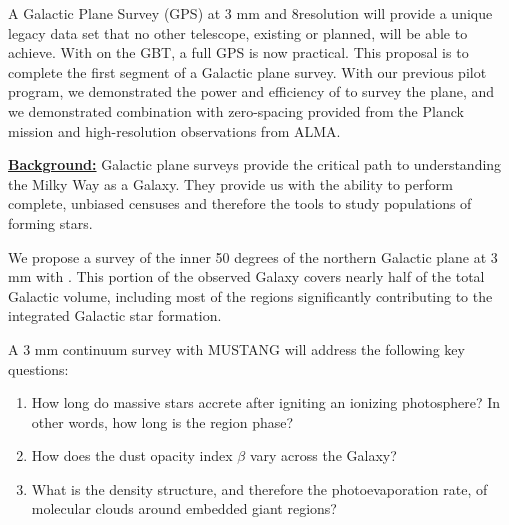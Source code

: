 \documentclass[11pt,preprint]{aastex_nofoot}
\begin{document}


A Galactic Plane Survey (GPS) at 3 mm and 8\arcsec resolution will provide a
unique legacy data set that no other telescope, existing or planned, will be
able to achieve.  With \MUSTANG on the GBT, a full GPS is now practical.  This
proposal is to complete the first segment of a Galactic plane survey.  With
our previous pilot program, we demonstrated the power and efficiency of \MUSTANG
to survey the plane, and we demonstrated combination with zero-spacing provided
from the Planck mission and high-resolution observations from ALMA.


\underline{\bf Background:}
Galactic plane surveys provide the critical path to understanding the Milky Way
as a Galaxy.  They provide us with the ability to perform complete, unbiased
censuses and therefore the tools to study populations of forming stars.

We propose a survey of the inner 50 degrees of the northern
Galactic plane at 3 mm with \MUSTANG.  This portion of the observed Galaxy covers
nearly half of the total Galactic volume, including most of the regions significantly
contributing to the integrated Galactic star formation.

A 3 mm continuum survey with MUSTANG will address the following key questions:

\vspace{-2.5mm}

\begin{enumerate}

    \item How long do massive stars accrete after igniting an ionizing photosphere?
        In other words, how long is the \hchii region phase?
    \item How does the dust opacity index $\beta$  vary across the Galaxy?  
    \item  What is the
        density structure, and therefore the photoevaporation rate, of 
        molecular clouds around embedded giant \hii regions?

\end{enumerate}
\vspace{-2.5mm}
\end{document}
